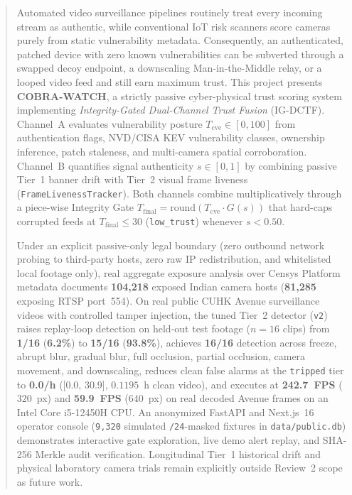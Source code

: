 \begin{abstract}
Automated video surveillance pipelines routinely treat every incoming stream as authentic, while conventional IoT risk scanners score cameras purely from static vulnerability metadata. Consequently, an authenticated, patched device with zero known vulnerabilities can be subverted through a swapped decoy endpoint, a downscaling Man-in-the-Middle relay, or a looped video feed and still earn maximum trust. This project presents \textbf{COBRA-WATCH}, a strictly passive cyber-physical trust scoring system implementing \emph{Integrity-Gated Dual-Channel Trust Fusion} (IG-DCTF). Channel~A evaluates vulnerability posture $T_{\mathrm{cve}} \in [0, 100]$ from authentication flags, NVD/CISA KEV vulnerability classes, ownership inference, patch staleness, and multi-camera spatial corroboration. Channel~B quantifies signal authenticity $s \in [0, 1]$ by combining passive Tier~1 banner drift with Tier~2 visual frame liveness (\texttt{FrameLivenessTracker}). Both channels combine multiplicatively through a piece-wise Integrity Gate $T_{\mathrm{final}} = \mathrm{round}(T_{\mathrm{cve}} \cdot G(s))$ that hard-caps corrupted feeds at $T_{\mathrm{final}} \le 30$ (\texttt{low\_trust}) whenever $s < 0.50$.

Under an explicit passive-only legal boundary (zero outbound network probing to third-party hosts, zero raw IP redistribution, and whitelisted local footage only), real aggregate exposure analysis over Censys Platform metadata documents \textbf{104,218} exposed Indian camera hosts (\textbf{81,285} exposing RTSP port~554). On real public CUHK Avenue surveillance videos with controlled tamper injection, the tuned Tier~2 detector (\texttt{v2}) raises replay-loop detection on held-out test footage ($n = 16$ clips) from \textbf{1/16} (\textbf{6.2\%}) to \textbf{15/16} (\textbf{93.8\%}), achieves \textbf{16/16} detection across freeze, abrupt blur, gradual blur, full occlusion, partial occlusion, camera movement, and downscaling, reduces clean false alarms at the \texttt{tripped} tier to \textbf{0.0/h} ([0.0, 30.9], $0.1195$~h clean video), and executes at \textbf{242.7~FPS} ($320$~px) and \textbf{59.9~FPS} ($640$~px) on real decoded Avenue frames on an Intel Core i5-12450H CPU. An anonymized FastAPI and Next.js~16 operator console (\texttt{9,320} simulated \texttt{/24}-masked fixtures in \texttt{data/public.db}) demonstrates interactive gate exploration, live demo alert replay, and SHA-256 Merkle audit verification. Longitudinal Tier~1 historical drift and physical laboratory camera trials remain explicitly outside Review~2 scope as future work.
\end{abstract}

\tableofcontents
\listoftables
\listoffigures

\cleardoublepage{}
